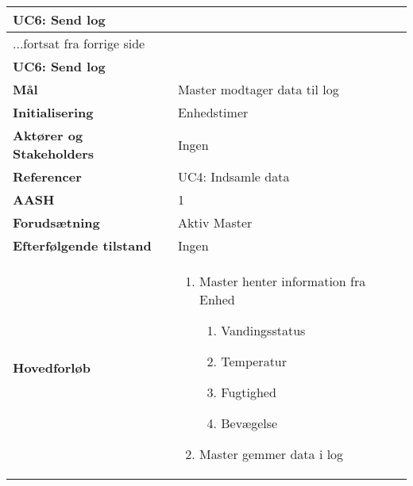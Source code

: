 \begin{center} \centering \label{UC6}
	\begin{longtable}{|p{5cm}|p{9cm}|}  %
	\hline
		\multicolumn{2}{|l|}{\textbf{UC6: Send log}} \\\hline %
		\endfirsthead
		
		\multicolumn{2}{l}{...fortsat fra forrige side} \\ \hline %
		\multicolumn{2}{|l|}{\textbf{UC6: Send log}} \\\hline %
		\endhead	
		
		\textbf{Mål}								&Master modtager data til log	\\\hline
		\textbf{Initialisering}					&Enhedstimer					\\\hline
		\textbf{Aktører og Stakeholders}			&Ingen						\\\hline
		\textbf{Referencer}						&UC4: Indsamle data			\\\hline
		\textbf{AASH}							&1							\\\hline
		\textbf{Forudsætning}					&Aktiv Master				\\\hline
		\textbf{Efterfølgende tilstand}			&Ingen						\\\hline
		\textbf{Hovedforløb}					
			&\begin{enumerate}
	
				\item Master henter information fra Enhed
				
				\begin{enumerate}
					\item Vandingsstatus
					\item Temperatur
					\item Fugtighed
					\item Bevægelse
				\end{enumerate}
				
				\item Master gemmer data i log

			\end{enumerate}\\\hline
	\end{longtable} 
\end{center}


